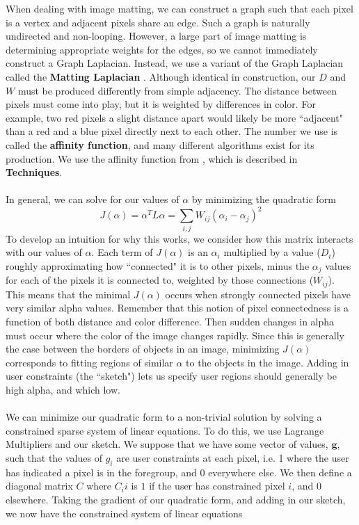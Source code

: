 When dealing with image matting, we can construct a graph such that each pixel is a vertex and adjacent pixels share an edge. Such a graph is naturally undirected and non-looping. However, a large part of image matting is determining appropriate weights for the edges, so we cannot immediately construct a Graph Laplacian. Instead, we use a variant of the Graph Laplacian called the \textbf{Matting Laplacian} \cite{levin08}.
Although identical in construction, our $D$ and $W$ must be produced differently from simple adjacency. The distance between pixels must come into play, but it is weighted by differences in color. For example, two red pixels a slight distance apart would likely be more ``adjacent" than a red and a blue pixel directly next to each other. The number we use is called the \textbf{affinity function}, and many different algorithms exist for its production. We use the affinity function from \cite{levin08}, which is described in \textbf{Techniques}.
\\\\
In general, we can solve for our values of $\alpha$ by minimizing the quadratic form
\[J(\alpha)=\alpha^T L\alpha=\sum_{i,j}W_{ij}(\alpha_i-\alpha_j)^2\]
To develop an intuition for why this works, we consider how this matrix interacts with our values of $\alpha$. Each term of $J(\alpha)$ is an $\alpha_i$ multiplied by a value ($D_i$) roughly approximating how ``connected" it is to other pixels, minus the $\alpha_j$ values for each of the pixels it is connected to, weighted by those connections ($W_{ij}$). This means that the minimal $J(\alpha)$ occurs when strongly connected pixels have very similar alpha values. Remember that this notion of pixel connectedness is a function of both distance and color difference. Then sudden changes in alpha must occur where the color of the image changes rapidly. Since this is generally the case between the borders of objects in an image, minimizing $J(\alpha)$ corresponds to fitting regions of similar $\alpha$ to the objects in the image. Adding in user constraints (the ``sketch") lets us specify user regions should generally be high alpha, and which low.
\\\\
We can minimize our quadratic form to a non-trivial solution by solving a constrained sparse system of linear equations.  To do this, we use Lagrange Multipliers and our sketch.
We suppose that we have some vector of values, $\textbf{g}$, such that the values of $g_i$ are user constraints at each pixel, i.e. 1 where the user has indicated a pixel is in the foregroup, and 0 everywhere else. We then define a diagonal matrix $C$ where $C_ii$ is $1$ if the user has constrained pixel $i$, and $0$ elsewhere. Taking the gradient of our quadratic form, and adding in our sketch, we now have the constrained system of linear equations
